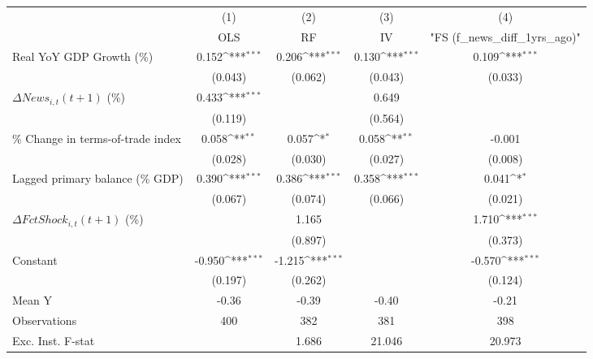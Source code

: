 {
\def\sym#1{\ifmmode^{#1}\else\(^{#1}\)\fi}
\begin{tabular}{l*{4}{c}}
\toprule
                    &\multicolumn{1}{c}{(1)}&\multicolumn{1}{c}{(2)}&\multicolumn{1}{c}{(3)}&\multicolumn{1}{c}{(4)}\\
                    &\multicolumn{1}{c}{OLS}&\multicolumn{1}{c}{RF}&\multicolumn{1}{c}{IV}&\multicolumn{1}{c}{ "FS (f_news_diff_1yrs_ago)" }\\
\midrule
Real YoY GDP Growth (\%)&       0.152\sym{***}&       0.206\sym{***}&       0.130\sym{***}&       0.109\sym{***}\\
                    &     (0.043)         &     (0.062)         &     (0.043)         &     (0.033)         \\
\addlinespace
$ \Delta News_{i,t}(t+1)$ (\%)&       0.433\sym{***}&                     &       0.649         &                     \\
                    &     (0.119)         &                     &     (0.564)         &                     \\
\addlinespace
\% Change in terms-of-trade index&       0.058\sym{**} &       0.057\sym{*}  &       0.058\sym{**} &      -0.001         \\
                    &     (0.028)         &     (0.030)         &     (0.027)         &     (0.008)         \\
\addlinespace
Lagged primary balance (\% GDP)&       0.390\sym{***}&       0.386\sym{***}&       0.358\sym{***}&       0.041\sym{*}  \\
                    &     (0.067)         &     (0.074)         &     (0.066)         &     (0.021)         \\
\addlinespace
$ \Delta FctShock_{i,t}(t+1)$ (\%)&                     &       1.165         &                     &       1.710\sym{***}\\
                    &                     &     (0.897)         &                     &     (0.373)         \\
\addlinespace
Constant            &      -0.950\sym{***}&      -1.215\sym{***}&                     &      -0.570\sym{***}\\
                    &     (0.197)         &     (0.262)         &                     &     (0.124)         \\
\midrule
Mean Y              &       -0.36         &       -0.39         &       -0.40         &       -0.21         \\
Observations        &         400         &         382         &         381         &         398         \\
Exc. Inst. F-stat   &                     &       1.686         &      21.046         &      20.973         \\
\bottomrule
\end{tabular}
}
